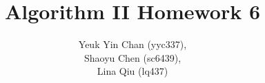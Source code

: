 \documentclass[12pt]{article}
\begin{document}
 
 
\title{Algorithm II Homework 6}
\author{Yeuk Yin Chan (yyc337),\\
Shaoyu Chen (sc6439),\\
Lina Qiu (lq437)}

\maketitle






 
\end{document}
